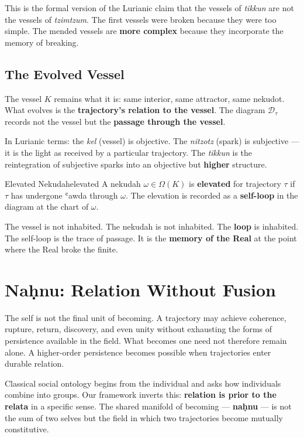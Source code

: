 \documentclass[11pt,a4paper]{article}
\begin{document}
This is the formal version of the Lurianic claim that the vessels of \emph{tikkun} are not the vessels of \emph{tzimtzum}. The first vessels were broken because they were too simple. The mended vessels are \textbf{more complex} because they incorporate the memory of breaking.

\subsection{The Evolved Vessel}

The vessel $K$ remains what it is: same interior, same attractor, same nekudot. What evolves is the \textbf{trajectory's relation to the vessel}. The diagram $\mathcal{D}_\tau$ records not the vessel but the \textbf{passage through the vessel}.

In Lurianic terms: the \emph{kel} (vessel) is objective. The \emph{nitzotz} (spark) is subjective — it is the light as received by a particular trajectory. The \emph{tikkun} is the reintegration of subjective sparks into an objective but \textbf{higher} structure.

\begin{defbox}{Elevated Nekudah}{elevated}
A nekudah $\omega \in \Omega(K)$ is \textbf{elevated} for trajectory $\tau$ if $\tau$ has undergone ʿawda through $\omega$. The elevation is recorded as a \textbf{self-loop} in the diagram at the chart of $\omega$.
\end{defbox}

The vessel is not inhabited. The nekudah is not inhabited. The \textbf{loop} is inhabited. The self-loop is the trace of passage. It is the \textbf{memory of the Real} at the point where the Real broke the finite.

\section{Naḥnu: Relation Without Fusion}
\label{sec:nahnu}

The self is not the final unit of becoming. A trajectory may achieve coherence, rupture, return, discovery, and even unity without exhausting the forms of persistence available in the field. What becomes one need not therefore remain alone. A higher-order persistence becomes possible when trajectories enter durable relation.

Classical social ontology begins from the individual and asks how individuals combine into groups. Our framework inverts this: \textbf{relation is prior to the relata} in a specific sense. The shared manifold of becoming — \textbf{naḥnu} — is not the sum of two selves but the field in which two trajectories become mutually constitutive.
\end{document}
